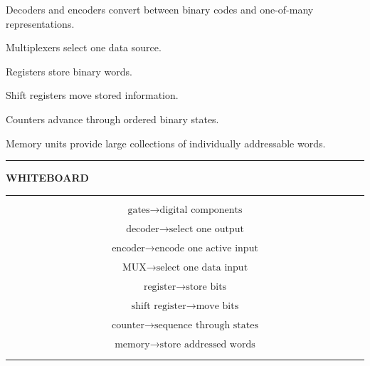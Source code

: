 \documentclass[11pt]{article}
\newenvironment{whiteboard}
{
    \par\medskip
    \hrule
    \vspace{0.35em}
    \noindent\textbf{\large WHITEBOARD}
    \par\vspace{0.3em}
    \hrule
    \vspace{0.65em}
}
{
    \vspace{0.45em}
    \hrule
    \par\medskip
}
\begin{document}
Decoders and encoders convert between binary codes and one-of-many
representations.

Multiplexers select one data source.

Registers store binary words.

Shift registers move stored information.

Counters advance through ordered binary states.

Memory units provide large collections of individually addressable words.

\begin{whiteboard}

\[
\boxed{
\text{gates}
\rightarrow
\text{digital components}
}
\]

\[
\boxed{
\text{decoder}
\rightarrow
\text{select one output}
}
\]

\[
\boxed{
\text{encoder}
\rightarrow
\text{encode one active input}
}
\]

\[
\boxed{
\text{MUX}
\rightarrow
\text{select one data input}
}
\]

\[
\boxed{
\text{register}
\rightarrow
\text{store bits}
}
\]

\[
\boxed{
\text{shift register}
\rightarrow
\text{move bits}
}
\]

\[
\boxed{
\text{counter}
\rightarrow
\text{sequence through states}
}
\]

\[
\boxed{
\text{memory}
\rightarrow
\text{store addressed words}
}
\]

\end{whiteboard}
\end{document}
